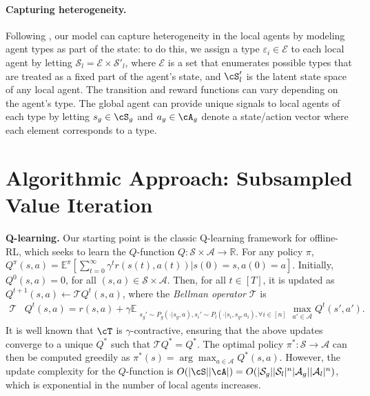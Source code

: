 \documentclass{article}
\theoremstyle{plain}
\theoremstyle{definition}
\def\E{\mathbb{E}}
\begin{document}
\paragraph{Capturing heterogeneity.} Following \citet{10.5555/3586589.3586718,xu2023decentralized}, our model can capture heterogeneity in the local agents by modeling agent types as part of the state: to do this, we assign a type $\varepsilon_i\in\mathcal{E}$ to each local agent by letting $\mathcal{S}_l = \mathcal{E}\times\mathcal{S}'_l$, where $\mathcal{E}$ is a set that enumerates possible types that are treated as a fixed part of the agent's state, and $\cS_l'$ is the latent state space of any local agent. The transition and reward functions can vary depending on the agent's type. The global agent can provide unique signals to local agents of each type by letting $s_g\in\cS_g$ and $a_g\in\cA_g$ denote a state/action vector where each element corresponds to a type.

\section{Algorithmic Approach: Subsampled Value Iteration}\label{subsec:our-approach}

\textbf{Q-learning.}\label{RL review} Our starting point is the classic Q-learning framework \citep{Watkins_Dayan_1992} for offline-RL, which seeks to learn the $Q$-function $Q:\mathcal{S}\times\mathcal{A}\to\mathbb{R}$. For any policy $\pi$, $Q^\pi(s,a)=\mathbb{E}^\pi[\sum_{t=0}^\infty\gamma^t r(s(t),a(t))|s(0)\!=\!s,a(0)\!=\!a]$. Initially, $Q^0(s,a)\!=\!0$, for all $(s,a)\in\mathcal{S}\!\times\!\mathcal{A}$. Then, for all $t\!\in\![T]$, it is updated as $Q^{t+1}(s,a)\!\gets\!\mathcal{T}Q^t(s,a)$, where the \emph{Bellman operator} $\mathcal{T}$ is\begin{align}
\mathcal{T}&Q^t(s,a)=r(s,a)+\gamma\E_{\substack{s_g'\sim P_g(\cdot|s_g,a), s_i'\sim P_l(\cdot|s_i,s_g,a_i), \forall i\in[n]}} \max_{a'\in\mathcal{A}}Q^t(s',a').\end{align} 
It is  well known that $\cT$ is $\gamma$-contractive, ensuring that the above updates converge to a unique $Q^*$ such that $\mathcal{T}Q^* = Q^*$. The optimal policy $\pi^*\!:\!\mathcal{S}\!\to\!\mathcal{A}$ can then be computed greedily as $\pi^*(s)=\arg\max_{a\in\mathcal{A}} Q^*(s, a)$. However, the update complexity for the $Q$-function is $O(|\cS||\cA|)=O(|\mathcal{S}_g||\mathcal{S}_l|^n|\mathcal{A}_g||\mathcal{A}_l|^n)$, which is exponential in the number of local agents increases.
\end{document}

